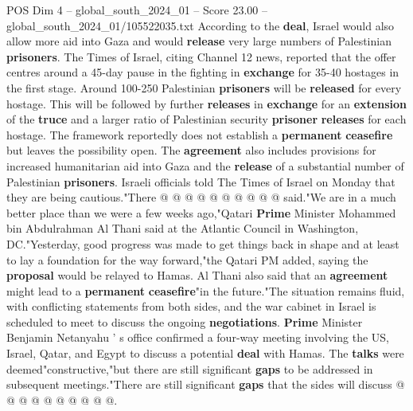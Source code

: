 \begin{textsample}{POS Dim 4 – global\_south\_2024\_01 – Score 23.00 – global\_south\_2024\_01/105522035.txt}
According to the \textbf{deal}, Israel would also allow more aid into Gaza and would \textbf{release} very large numbers of Palestinian \textbf{prisoners}.
The Times of Israel, citing Channel 12 news, reported that the offer centres around a 45-day pause in the fighting in \textbf{exchange} for 35-40 hostages in the first stage.
Around 100-250 Palestinian \textbf{prisoners} will be \textbf{released} for every hostage.
This will be followed by further \textbf{releases} in \textbf{exchange} for an \textbf{extension} of the \textbf{truce} and a larger ratio of Palestinian security \textbf{prisoner} \textbf{releases} for each hostage.
The framework reportedly does not establish a \textbf{permanent} \textbf{ceasefire} but leaves the possibility open.
The \textbf{agreement} also includes provisions for increased humanitarian aid into Gaza and the \textbf{release} of a substantial number of Palestinian \textbf{prisoners}.
Israeli officials told The Times of Israel on Monday that they are being cautious."There @ @ @ @ @ @ @ @ @ @ said."We are in a much better place than we were a few weeks ago,"Qatari \textbf{Prime} Minister Mohammed bin Abdulrahman Al Thani said at the Atlantic Council in Washington, DC."Yesterday, good progress was made to get things back in shape and at least to lay a foundation for the way forward,"the Qatari PM added, saying the \textbf{proposal} would be relayed to Hamas.
Al Thani also said that an \textbf{agreement} might lead to a \textbf{permanent} \textbf{ceasefire}"in the future."The situation remains fluid, with conflicting statements from both sides, and the war cabinet in Israel is scheduled to meet to discuss the ongoing \textbf{negotiations}. \textbf{Prime} Minister Benjamin Netanyahu ' s office confirmed a four-way meeting involving the US, Israel, Qatar, and Egypt to discuss a potential \textbf{deal} with Hamas.
The \textbf{talks} were deemed"constructive,"but there are still significant \textbf{gaps} to be addressed in subsequent meetings."There are still significant \textbf{gaps} that the sides will discuss @ @ @ @ @ @ @ @ @ @.

\end{textsample}
